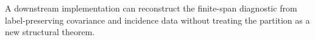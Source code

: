 A downstream implementation can reconstruct the finite-span diagnostic from label-preserving covariance and incidence data without treating the partition as a new structural theorem.